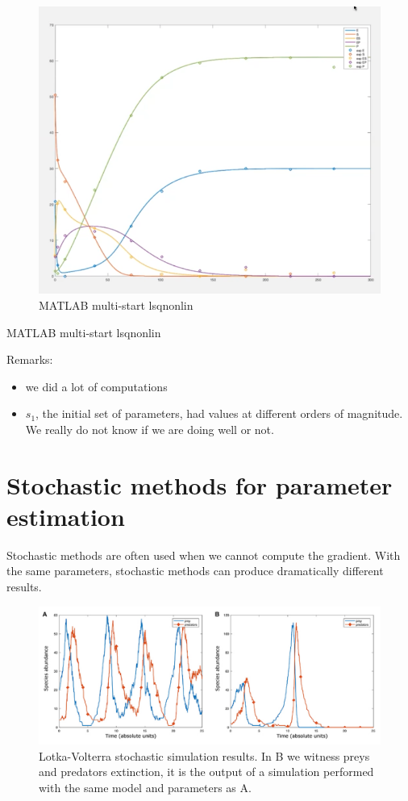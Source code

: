 \begin{figure}
\centering
\includegraphics{multistep.png}
\caption{MATLAB multi-start lsqnonlin}
\end{figure}

MATLAB multi-start lsqnonlin

Remarks:

\begin{itemize}
\tightlist
\item
  we did a lot of computations
\item
  $s_1$, the initial set of parameters, had values at different orders
  of magnitude. We really do not know if we are doing well or not.
\end{itemize}

\hypertarget{stochastic-methods-for-parameter-estimation}{%
\section{Stochastic methods for parameter
estimation}\label{stochastic-methods-for-parameter-estimation}}

Stochastic methods are often used when we cannot compute the gradient.
With the same parameters, stochastic methods can produce dramatically
different results.

\begin{figure}
\centering
\includegraphics{stoch_LV.png}
\caption{Lotka-Volterra stochastic simulation results. In B we witness
preys and predators extinction, it is the output of a simulation
performed with the same model and parameters as A.}
\end{figure}

